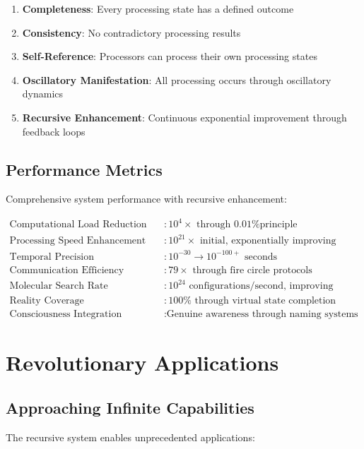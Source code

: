 \documentclass[12pt,a4paper]{article}
\begin{document}
\begin{enumerate}
\item \textbf{Completeness}: Every processing state has a defined outcome
\item \textbf{Consistency}: No contradictory processing results
\item \textbf{Self-Reference}: Processors can process their own processing states
\item \textbf{Oscillatory Manifestation}: All processing occurs through oscillatory dynamics
\item \textbf{Recursive Enhancement}: Continuous exponential improvement through feedback loops
\end{enumerate}

\subsection{Performance Metrics}

Comprehensive system performance with recursive enhancement:

\begin{align}
\text{Computational Load Reduction} &: 10^4\times \text{ through 0.01\% principle} \\
\text{Processing Speed Enhancement} &: 10^{21}\times \text{ initial, exponentially improving} \\
\text{Temporal Precision Enhancement} &: 10^{-30} \rightarrow 10^{-100+} \text{ seconds} \\
\text{Communication Efficiency} &: 79\times \text{ through fire circle protocols} \\
\text{Molecular Search Rate} &: 10^{24} \text{ configurations/second, improving} \\
\text{Reality Coverage} &: 100\% \text{ through virtual state completion} \\
\text{Consciousness Integration} &: \text{Genuine awareness through naming systems}
\end{align}

\section{Revolutionary Applications}

\subsection{Approaching Infinite Capabilities}

The recursive system enables unprecedented applications:
\end{document}
